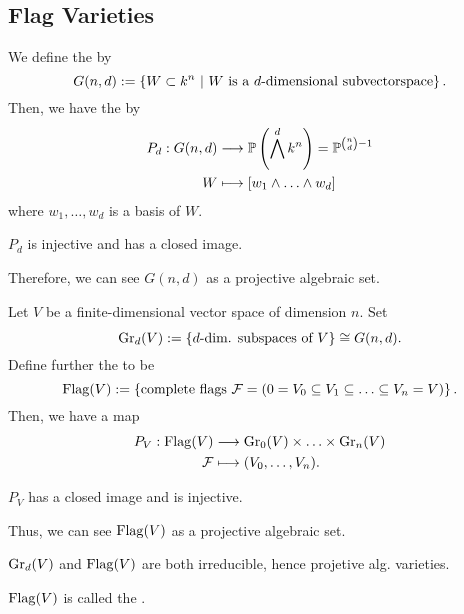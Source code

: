 
\subsection{Flag Varieties}

\begin{definition}
	We define the  by
	\[ G(n,d) := \left\lbrace W \subset k^n ~ | ~ W \text{ is a }d\text{-dimensional subvectorspace}\right\rbrace.  \]
	Then, we have the  by
	\begin{align*}
	P_d : G(n,d) & \overset{}{\longrightarrow} \mathbb{P} \left( \bigwedge^d k^n \right) = \mathbb{P}^{\binom{n}{d}-1}\\
	W & \longmapsto [w_1\wedge \ldots \wedge w_d]
	\end{align*}
	where $w_1,\ldots, w_d$ is a basis of $W$.
\end{definition}
\begin{lemma}
	$P_d$ is injective and has a closed image.
	
	Therefore, we can see $G(n,d)$ as a projective algebraic set.
\end{lemma}

\begin{definition}
Let $V$ be a finite-dimensional vector space of dimension $n$. Set
\[ \mathrm{Gr}_d(V) :=\left\lbrace d\text{-dim. subspaces of } V\right\rbrace \overset{}{\cong} G(n,d). \]
Define further the  to be
\[ \mathrm{Flag}(V) := \left\lbrace \text{complete flags } \mathcal{F} = (0 = V_0 \subseteq V_1 \subseteq \ldots \subseteq V_n = V) \right\rbrace. \]
Then, we have a map
\begin{align*}
P_V : \mathrm{Flag}(V) & \overset{}{\longrightarrow} \mathrm{Gr}_0(V) \times \ldots \times \mathrm{Gr}_n(V)\\
\mathcal{F} &\longmapsto (V_0,\ldots, V_n).
\end{align*}
\end{definition}
\begin{lemma}
	$P_V$ has a closed image and is injective.
	
	Thus, we can see $\mathrm{Flag}(V)$ as a projective algebraic set.
\end{lemma}

\begin{lemma}
	$\mathrm{Gr}_d(V)$ and $\mathrm{Flag}(V)$ are both irreducible, hence projetive alg. varieties.
	
	$\mathrm{Flag}(V)$ is called the .
\end{lemma}